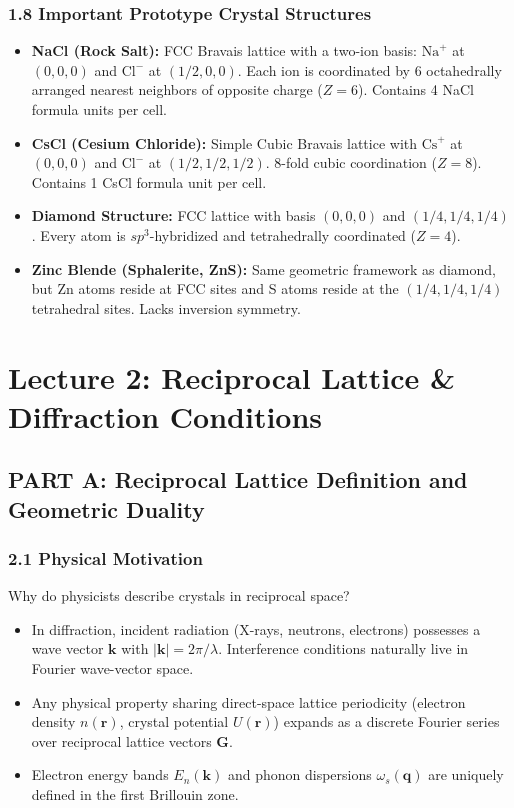 \documentclass[11pt,a4paper]{article}
\begin{document}
\subsubsection{1.8 Important Prototype Crystal Structures}
\begin{itemize}[leftmargin=1.5em]
    \item \textbf{NaCl (Rock Salt):} FCC Bravais lattice with a two-ion basis: $\text{Na}^+$ at $(0,0,0)$ and $\text{Cl}^-$ at $(1/2,0,0)$. Each ion is coordinated by 6 octahedrally arranged nearest neighbors of opposite charge ($Z=6$). Contains 4 NaCl formula units per cell.
    \item \textbf{CsCl (Cesium Chloride):} Simple Cubic Bravais lattice with $\text{Cs}^+$ at $(0,0,0)$ and $\text{Cl}^-$ at $(1/2,1/2,1/2)$. 8-fold cubic coordination ($Z=8$). Contains 1 CsCl formula unit per cell.
    \item \textbf{Diamond Structure:} FCC lattice with basis $(0,0,0)$ and $(1/4,1/4,1/4)$. Every atom is $sp^3$-hybridized and tetrahedrally coordinated ($Z=4$).
    \item \textbf{Zinc Blende (Sphalerite, ZnS):} Same geometric framework as diamond, but Zn atoms reside at FCC sites and S atoms reside at the $(1/4,1/4,1/4)$ tetrahedral sites. Lacks inversion symmetry.
\end{itemize}

\newpage

\section{Lecture 2: Reciprocal Lattice \& Diffraction Conditions}

\subsection{PART A: Reciprocal Lattice Definition and Geometric Duality}

\subsubsection{2.1 Physical Motivation}
Why do physicists describe crystals in reciprocal space?
\begin{itemize}[leftmargin=1.5em]
    \item In diffraction, incident radiation (X-rays, neutrons, electrons) possesses a wave vector $\mathbf{k}$ with $|\mathbf{k}| = 2\pi/\lambda$. Interference conditions naturally live in Fourier wave-vector space.
    \item Any physical property sharing direct-space lattice periodicity (electron density $n(\mathbf{r})$, crystal potential $U(\mathbf{r})$) expands as a discrete Fourier series over reciprocal lattice vectors $\mathbf{G}$.
    \item Electron energy bands $E_n(\mathbf{k})$ and phonon dispersions $\omega_s(\mathbf{q})$ are uniquely defined in the first Brillouin zone.
\end{itemize}
\end{document}

